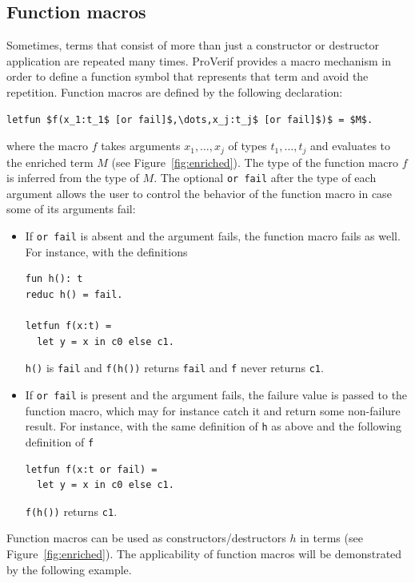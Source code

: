 \documentclass{book}
\begin{document}
\subsection{Function macros}\label{sec:functionmacros}

Sometimes, terms that consist of more than just a constructor or destructor application are repeated many times. ProVerif provides a macro mechanism in order to define a function symbol that represents that term and avoid the repetition. Function macros are defined by the following declaration:
\begin{lstlisting}[numbers=none]
	letfun $f(x_1:t_1$ [or fail]$,\dots,x_j:t_j$ [or fail]$)$ = $M$.
\end{lstlisting}
where the macro $f$ takes arguments $x_1,\dots,x_j$ of types $t_1,\dots,t_j$ and evaluates to the enriched term $M$ (see Figure~\ref{fig:enriched}). The type of the function macro $f$ is inferred from the type of $M$. The optional \lstinline!or fail! after the type of each argument allows the user to control the behavior of the function macro in case some of its arguments fail:
\begin{itemize}
\item If \lstinline!or fail! is absent and the argument fails, the function macro fails as well.
For instance, with the definitions
\begin{lstlisting}[numbers=none]
fun h(): t
reduc h() = fail.

letfun f(x:t) =
  let y = x in c0 else c1.
\end{lstlisting}
\lstinline!h()! is \lstinline!fail! and \lstinline!f(h())! returns \lstinline!fail! and \lstinline!f! never returns \lstinline!c1!.

\item If \lstinline!or fail! is present and the argument fails, the failure value is passed to the function macro, which may for instance catch it and return some non-failure result.
For instance, with the same definition of \lstinline!h! as above and the following definition of \lstinline!f!
\begin{lstlisting}[numbers=none]
letfun f(x:t or fail) =
  let y = x in c0 else c1.
\end{lstlisting}
\lstinline!f(h())! returns \lstinline!c1!.

\end{itemize}
Function macros can be used as constructors/destructors $h$ in terms (see Figure~\ref{fig:enriched}). The applicability of function macros will be demonstrated by the following example.
\end{document}
